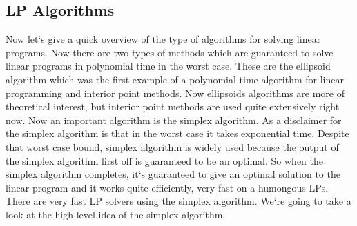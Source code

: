 \subsection{LP Algorithms}
Now let`s give a quick overview of the type of algorithms for solving linear programs.
Now there are two types of methods which are guaranteed to solve linear programs in polynomial time in the worst case.
These are the ellipsoid algorithm which was the first example of a polynomial time algorithm for linear programming and interior point methods.
Now ellipsoids algorithms are more of theoretical interest, but interior point methods are used quite extensively right now.
Now an important algorithm is the simplex algorithm.
As a disclaimer for the simplex algorithm is that in the worst case it takes exponential time.
Despite that worst case bound, simplex algorithm is widely used because the output of the simplex algorithm first off is guaranteed to be an optimal.
So when the simplex algorithm completes, it`s guaranteed to give an optimal solution to the linear program and it works quite efficiently, very fast on a humongous LPs.
There are very fast LP solvers using the simplex algorithm.
We`re going to take a look at the high level idea of the simplex algorithm.


